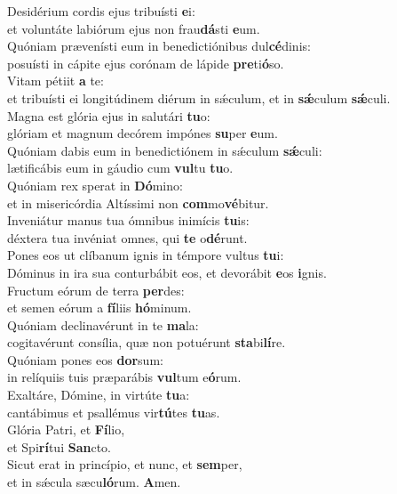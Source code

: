 \evenverse Desidérium cordis ejus tribuísti \textbf{e}i:~\*\\
\evenverse et voluntáte labiórum ejus non frau\textbf{dá}sti \textbf{e}um.\\
\oddverse Quóniam prævenísti eum in benedictiónibus dul\textbf{cé}dinis:~\*\\
\oddverse posuísti in cápite ejus corónam de lápide \textbf{pre}ti\textbf{ó}so.\\
\evenverse Vitam pétiit \textbf{a} te:~\*\\
\evenverse et tribuísti ei longitúdinem diérum in sǽculum, et in \textbf{sǽ}culum \textbf{sǽ}culi.\\
\oddverse Magna est glória ejus in salutári \textbf{tu}o:~\*\\
\oddverse glóriam et magnum decórem impónes \textbf{su}per \textbf{e}um.\\
\evenverse Quóniam dabis eum in benedictiónem in sǽculum \textbf{sǽ}culi:~\*\\
\evenverse lætificábis eum in gáudio cum \textbf{vul}tu \textbf{tu}o.\\
\oddverse Quóniam rex sperat in \textbf{Dó}mino:~\*\\
\oddverse et in misericórdia Altíssimi non \textbf{com}mo\textbf{vé}bitur.\\
\evenverse Inveniátur manus tua ómnibus inimícis \textbf{tu}is:~\*\\
\evenverse déxtera tua invéniat omnes, qui \textbf{te} o\textbf{dé}runt.\\
\oddverse Pones eos ut clíbanum ignis in témpore vultus \textbf{tu}i:~\*\\
\oddverse Dóminus in ira sua conturbábit eos, et devorábit \textbf{e}os \textbf{i}gnis.\\
\evenverse Fructum eórum de terra \textbf{per}des:~\*\\
\evenverse et semen eórum a \textbf{fí}liis \textbf{hó}minum.\\
\oddverse Quóniam declinavérunt in te \textbf{ma}la:~\*\\
\oddverse cogitavérunt consília, quæ non potuérunt \textbf{sta}bi\textbf{lí}re.\\
\evenverse Quóniam pones eos \textbf{dor}sum:~\*\\
\evenverse in relíquiis tuis præparábis \textbf{vul}tum e\textbf{ó}rum.\\
\oddverse Exaltáre, Dómine, in virtúte \textbf{tu}a:~\*\\
\oddverse cantábimus et psallémus vir\textbf{tú}tes \textbf{tu}as.\\
\evenverse Glória Patri, et \textbf{Fí}lio,~\*\\
\evenverse et Spi\textbf{rí}tui \textbf{San}cto.\\
\oddverse Sicut erat in princípio, et nunc, et \textbf{sem}per,~\*\\
\oddverse et in sǽcula sæcu\textbf{ló}rum. \textbf{A}men.\\
